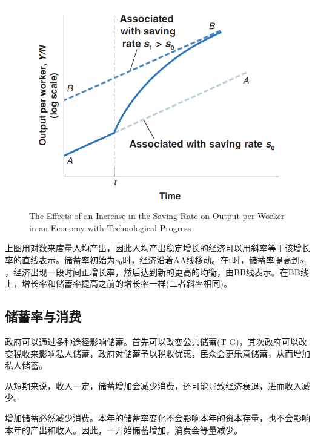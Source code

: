 \documentclass{article}
\begin{document}
\begin{figure}[H] %
	\centering %
	\includegraphics[width=1\textwidth]{11_5} %
	\caption{The Effects of an Increase
		in the Saving Rate on
		Output per Worker
		in an Economy with
		Technological Progress} %
	\label{Fig.main6} %
\end{figure}

上图用对数来度量人均产出，因此人均产出稳定增长的经济可以用斜率等于该增长率的直线表示。储蓄率初始为$ s_0 $时，经济沿着AA线移动。在t时，储蓄率提高到$ s_1 $，经济出现一段时间正增长率，然后达到新的更高的均衡，由BB线表示。在BB线上，增长率和储蓄率提高之前的增长率一样(二者斜率相同)。


\subsection{储蓄率与消费}

政府可以通过多种途径影响储蓄。首先可以改变公共储蓄(T-G)，其次政府可以改变税收来影响私人储蓄，政府对储蓄予以税收优惠，民众会更乐意储蓄，从而增加私人储蓄。

\hspace*{\fill}

从短期来说，收入一定，储蓄增加会减少消费，还可能导致经济衰退，进而收入减少。

\hspace*{\fill}

增加储蓄必然减少消费。本年的储蓄率变化不会影响本年的资本存量，也不会影响本年的产出和收入。因此，一开始储蓄增加，消费会等量减少。
\end{document}

